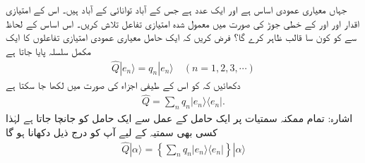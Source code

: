 جہاں  معیاری عمودی اساس ہے اور  ایک عدد ہے جس کے آباد توانائی کے آباد ہیں۔ اس کے امتیازی اقدار اور  اور  کے خطی جوڑ کی صورت میں معمول شدہ امتیازی تفاعل تلاش کریں۔ اس اساس کے لحاظ سے  کو کون سا قالب   ظاہر کرے گا؟ 
 فرض کریں کہ ایک حامل  معیاری عمودی امتیازی تفاعلوں کا ایک مکمل سلسلہ پایا جاتا ہے 
\begin{align*}
\hat{Q}|e_{n} \rangle = q_{n} | e_{n} \rangle \quad (n = 1,2,3,\cdots )
\end{align*}
دکھائیں کہ  کو اس کے طیفی اجزاء کی صورت میں لکھا جا سکتا ہے 
\begin{align*}
\hat{Q} = \sum_{n} q_{n} | e_{n} \rangle \langle e_{n} |. 
\end{align*}
اشارہ: تمام ممکنہ سمتیات پر ایک حامل کے عمل سے ایک حامل کو جانچا جاتا ہے لہٰذا کسی بھی سمتیہ  کے لیے آپ کو درج ذیل دکھانا ہو گا 
\begin{align*}
\hat{Q} | \alpha \rangle = \left\{ \sum_{n} q_{n} | e_{n} \rangle \langle e_{n} | \right\} | \alpha \rangle 
\end{align*}

